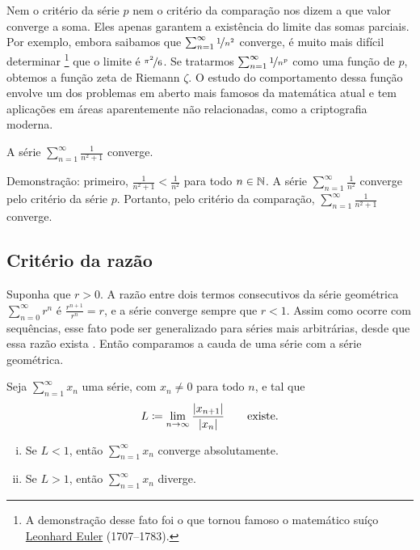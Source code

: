 Nem o critério da série $p$ nem o critério da comparação
nos dizem a que valor converge a soma. Eles apenas garantem a existência
do limite das somas parciais. Por exemplo, embora saibamos que
$\sum_{n=1}^\infty \nicefrac{1}{n^2}$ converge, é muito mais difícil determinar
\footnote{A demonstração desse fato foi o que tornou famoso o matemático suíço
\href{https://en.wikipedia.org/wiki/Leonhard_Euler}{Leonhard Euler}
(1707--1783).}
que o limite é $\nicefrac{\pi^2}{6}$.
Se tratarmos $\sum_{n=1}^\infty \nicefrac{1}{n^p}$ como uma função de $p$,
obtemos a função zeta de Riemann $\zeta$. O estudo do
comportamento dessa função envolve
um dos problemas em aberto mais famosos da matemática atual e tem aplicações
em áreas aparentemente não relacionadas, como a criptografia moderna.

\begin{example}
A série $\sum_{n=1}^\infty \frac{1}{n^2+1}$ converge.

Demonstração: primeiro, $\frac{1}{n^2+1} < \frac{1}{n^2}$ para todo $n \in {\mathbb{N}}$.
A série $\sum_{n=1}^\infty \frac{1}{n^2}$ converge pelo critério da série $p$.
Portanto, pelo critério da comparação, $\sum_{n=1}^\infty \frac{1}{n^2+1}$ converge.
\end{example}

\subsection{Critério da razão}

Suponha que $r > 0$. A razão entre dois termos consecutivos da série geométrica
$\sum_{n=0}^\infty r^n$ é $\frac{r^{n+1}}{r^n} = r$, e a série converge
sempre que $r < 1$. Assim como ocorre com sequências, esse fato
pode ser generalizado para séries mais arbitrárias,
desde que essa razão exista . Então comparamos
a cauda de uma série com a série geométrica.


\begin{prop}
Seja $\sum_{n=1}^\infty x_n$ uma série, com $x_n \neq 0$ para todo $n$, e tal que
\begin{equation*}
L \coloneqq \lim_{n\to\infty} \frac{\lvert {x_{n+1}} \rvert}{\lvert {x_n} \rvert}
\qquad \text{existe.}
\end{equation*}
\begin{enumerate}[(i)]
\item
Se $L < 1$, então $\sum_{n=1}^\infty x_n$ converge absolutamente.
\item
Se $L > 1$, então $\sum_{n=1}^\infty x_n$ diverge.
\end{enumerate}
\end{prop}

